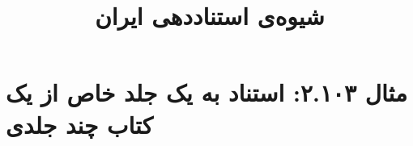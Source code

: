 \documentclass[a4paper,10pt]{article}
\begin{document}
\title{شیوه‌ی استناددهی ایران
 }
\author{}
\date{}
\maketitle



\section*{مثال ۲.۱۰۳: استناد به یک جلد خاص از یک کتاب چند جلدی}

\cite{صفا1368}\\
\cite{wright1969}\\






\end{document}
